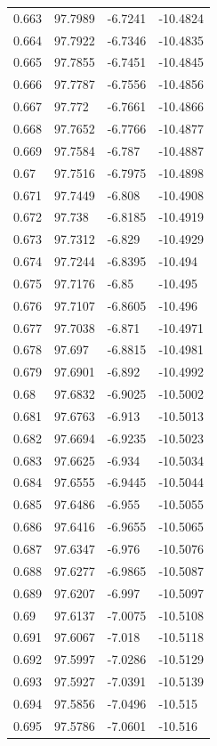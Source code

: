 \begin{tabular}{llll}
0.663 & 97.7989 & -6.7241 & -10.4824 \\
0.664 & 97.7922 & -6.7346 & -10.4835 \\
0.665 & 97.7855 & -6.7451 & -10.4845 \\
0.666 & 97.7787 & -6.7556 & -10.4856 \\
0.667 & 97.772 & -6.7661 & -10.4866 \\
0.668 & 97.7652 & -6.7766 & -10.4877 \\
0.669 & 97.7584 & -6.787 & -10.4887 \\
0.67 & 97.7516 & -6.7975 & -10.4898 \\
0.671 & 97.7449 & -6.808 & -10.4908 \\
0.672 & 97.738 & -6.8185 & -10.4919 \\
0.673 & 97.7312 & -6.829 & -10.4929 \\
0.674 & 97.7244 & -6.8395 & -10.494 \\
0.675 & 97.7176 & -6.85 & -10.495 \\
0.676 & 97.7107 & -6.8605 & -10.496 \\
0.677 & 97.7038 & -6.871 & -10.4971 \\
0.678 & 97.697 & -6.8815 & -10.4981 \\
0.679 & 97.6901 & -6.892 & -10.4992 \\
0.68 & 97.6832 & -6.9025 & -10.5002 \\
0.681 & 97.6763 & -6.913 & -10.5013 \\
0.682 & 97.6694 & -6.9235 & -10.5023 \\
0.683 & 97.6625 & -6.934 & -10.5034 \\
0.684 & 97.6555 & -6.9445 & -10.5044 \\
0.685 & 97.6486 & -6.955 & -10.5055 \\
0.686 & 97.6416 & -6.9655 & -10.5065 \\
0.687 & 97.6347 & -6.976 & -10.5076 \\
0.688 & 97.6277 & -6.9865 & -10.5087 \\
0.689 & 97.6207 & -6.997 & -10.5097 \\
0.69 & 97.6137 & -7.0075 & -10.5108 \\
0.691 & 97.6067 & -7.018 & -10.5118 \\
0.692 & 97.5997 & -7.0286 & -10.5129 \\
0.693 & 97.5927 & -7.0391 & -10.5139 \\
0.694 & 97.5856 & -7.0496 & -10.515 \\
0.695 & 97.5786 & -7.0601 & -10.516 \\

\end{tabular}
